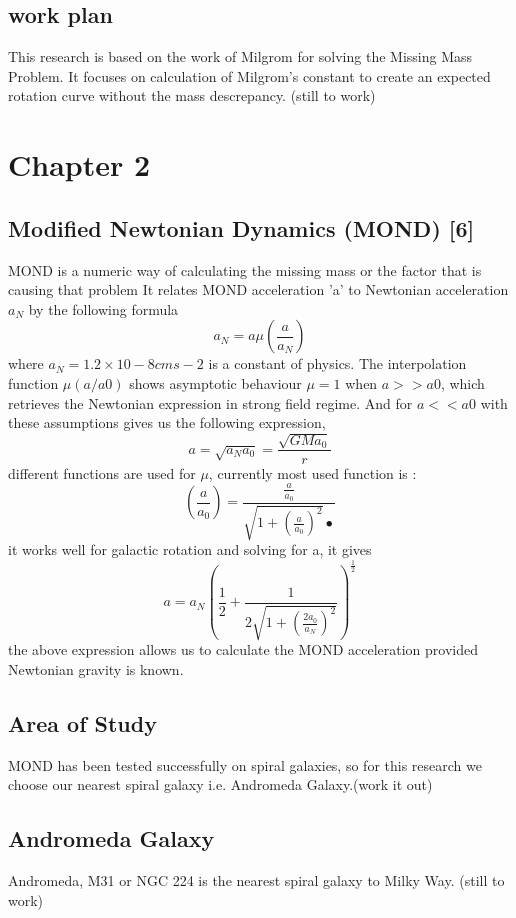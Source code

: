 \documentclass{article}
\begin{document}
\subsection{work plan}
 This research is based on the work of Milgrom for solving the Missing Mass Problem. It focuses on calculation of Milgrom's constant to create an expected rotation curve without the mass descrepancy. 
(still to work)

\section{Chapter 2}
\subsection{Modified Newtonian Dynamics (MOND) [6]}
MOND is a numeric way of calculating the missing mass or the factor that is causing that problem   It relates MOND acceleration 'a' to Newtonian acceleration $a_{N}$ by the following formula \begin{equation}
 a_{N}= a\mu(\frac{a}{a_{N}})
\end{equation}
where $a_{N} = 1.2×10-8  cms-2$  is a constant of physics. 
The interpolation function $\mu (a/a0)$ shows asymptotic behaviour $\mu=1$ when $a>> a0$,  which retrieves the Newtonian expression in strong field regime. And for $a << a0$ with these assumptions gives us the following expression, 
\begin{equation}
a= \sqrt{a_{N}a_{0}}= \frac{\sqrt{GMa_{0}}}{r}
\end{equation} 
different functions are used for $\mu$, currently most used function is :
\begin{equation}
(\frac{a}{a_{0}}) = \frac{\frac{a}{a_{0}}}{\sqrt{1+(\frac{a}{a_{0}})^2}•}
\end{equation} 
it works well for galactic rotation and solving for a, it gives 
\begin{equation}
a= a_{N}(\frac{1}{2}+\frac{1}{2\sqrt{1+(\frac{2a_{0}}{a_{N}})^2}})^\frac{1}{2}
\end{equation}
the above expression allows us to calculate the MOND acceleration provided Newtonian gravity is known. 
\subsection{Area of Study}
  MOND has been tested successfully on spiral galaxies, so for this research we choose our nearest spiral galaxy i.e. Andromeda Galaxy.(work it out)
  \subsection*{Andromeda Galaxy}
  Andromeda, M31 or NGC 224 is the nearest spiral galaxy to Milky Way.  (still to work)
\end{document}
